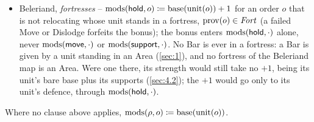 \documentclass[12pt,a4paper]{article}
\begin{document}
\begin{itemize}
That is one more circularity source beside those of \cref{sec:5.2}, with a backup rule of its own to settle; the cut of \cref{sec:3.2} would stop being a closed-form function of the order sheets and the convoy viabilities; and the resolver of \cref{sec:6} would have to carry the base of such a Move as an interval until the fates of its fleets are decided.
None of this would change an outcome on any map that exists, because none has a mixed coast: the price is a more complex algorithm, and the gain in every existing scenario is nothing.
So the calculus decides statically what the order sheets can decide and leaves the rest, and a map with a mixed coast would reopen that choice.
\item Beleriand, \emph{fortresses} -- $\operatorname{mods}(\mathsf{hold}, o) \coloneqq \operatorname{base}(\operatorname{unit}(o)) + 1$ for an order $o$ that is not relocating whose unit stands in a fortress, $\operatorname{prov}(o) \in \mathit{Fort}$ (a failed Move or Dislodge forfeits the bonus); the bonus enters $\operatorname{mods}(\mathsf{hold}, \cdot)$ alone, never $\operatorname{mods}(\mathsf{move}, \cdot)$ or $\operatorname{mods}(\mathsf{support}, \cdot)$.
No Bar is ever in a fortress: a Bar is given by a unit standing in an Area (\cref{sec:1}), and no fortress of the Beleriand map is an Area.
Were one there, its strength would still take no $+1$, being its unit's bare base plus its supports (\cref{sec:4.2}); the $+1$ would go only to its unit's defence, through $\operatorname{mods}(\mathsf{hold}, \cdot)$.
\end{itemize}
Where no clause above applies, $\operatorname{mods}(\rho, o) \coloneqq \operatorname{base}(\operatorname{unit}(o))$.
\end{document}
